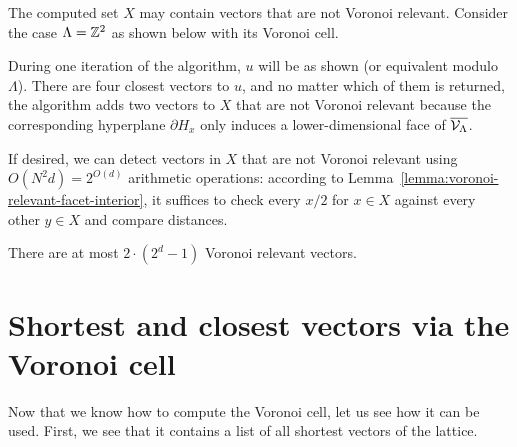 \begin{example}
  The computed set $X$ may contain vectors that are not Voronoi relevant.
  Consider the case $\Lambda = \mathbb{Z}^2$ as shown below with its Voronoi cell.
  \begin{center}
  \end{center}
  During one iteration of the algorithm, $u$ will be as shown (or equivalent modulo $\Lambda$).
  There are four closest vectors to $u$, and no matter which of them is returned,
  the algorithm adds two vectors to $X$ that are not Voronoi relevant because
  the corresponding hyperplane $\partial H_x$ only induces
  a lower-dimensional face of $\overline{\mathcal{V}_\Lambda}$.
\end{example}

If desired, we can detect vectors in $X$ that are not Voronoi relevant
using $O(N^2 d) = 2^{O(d)}$ arithmetic operations:
according to Lemma~\ref{lemma:voronoi-relevant-facet-interior},
it suffices to check every $x/2$ for $x \in X$ against every other $y \in X$
and compare distances.


\begin{corollary}
  \label{cor:number-of-voronoi-relevant}
  There are at most $2 \cdot (2^d - 1)$ Voronoi relevant vectors.
\end{corollary}



\section{Shortest and closest vectors via the Voronoi cell}

Now that we know how to compute the Voronoi cell,
let us see how it can be used.
First, we see that it contains a list of all shortest vectors of the lattice.

